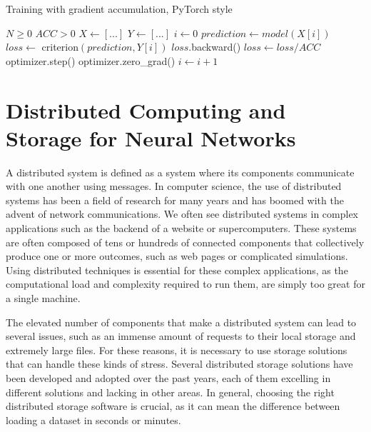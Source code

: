 \begin{algorithm}
    \caption{Training with gradient accumulation, PyTorch style}\label{alg:grad-acc-training}
    \begin{algorithmic}
        \Require $N \geq 0$
        \Require $ACC > 0$
        \State $X \gets [...]$ 
        \State $Y \gets [...]$ 
        \State $i \gets 0$
        \State $prediction \gets model(X[i])$
        \State $loss \gets $ criterion$(prediction, Y[i])$
        \State $loss$.backward()
        \State $loss \gets loss / ACC$
        \State optimizer.step()
        \State optimizer.zero\_grad()
        \EndIf
        \State $i \gets i + 1$
        \EndWhile
    \end{algorithmic}
\end{algorithm}

\section{Distributed Computing and Storage for Neural Networks}

A distributed system is defined as a system where its components communicate with one another using messages.
In computer science, the use of distributed systems has been a field of research for many years and has boomed with the advent of network communications.
We often see distributed systems in complex applications such as the backend of a website or supercomputers.
These systems are often composed of tens or hundreds of connected components that collectively produce one or more outcomes, such as web pages or complicated simulations.
Using distributed techniques is essential for these complex applications, as the computational load and complexity required to run them, are simply too great for a single machine.

The elevated number of components that make a distributed system can lead to several issues, such as an immense amount of requests to their local storage and extremely large files.
For these reasons, it is necessary to use storage solutions that can handle these kinds of stress.
Several distributed storage solutions have been developed and adopted over the past years, each of them excelling in different solutions and lacking in other areas.
In general, choosing the right distributed storage software is crucial, as it can mean the difference between loading a dataset in seconds or minutes.

